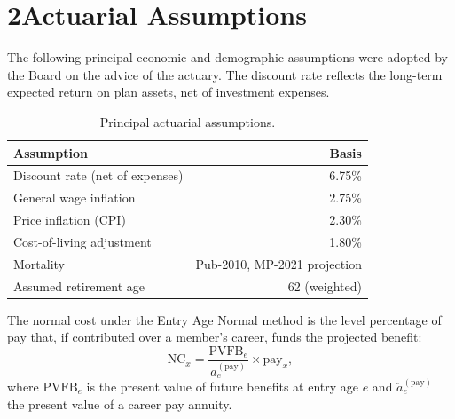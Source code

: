 \section{2\quad Actuarial Assumptions}
The following principal economic and demographic assumptions were adopted by the Board on
the advice of the actuary. The discount rate reflects the long-term expected return on plan
assets, net of investment expenses.

\begin{table}[ht]\centering
\caption{Principal actuarial assumptions.}
\begin{tabularx}{\linewidth}{@{}X R@{}}
\toprule
\textbf{Assumption} & \textbf{Basis}\\
\midrule
Discount rate (net of expenses) & 6.75\%\\
General wage inflation          & 2.75\%\\
Price inflation (CPI)           & 2.30\%\\
Cost-of-living adjustment       & 1.80\%\\
Mortality                       & Pub-2010, MP-2021 projection\\
Assumed retirement age          & 62 (weighted)\\
\bottomrule
\end{tabularx}
\end{table}

The normal cost under the Entry Age Normal method is the level percentage of pay that, if
contributed over a member's career, funds the projected benefit:
\begin{equation}
\text{NC}_x = \frac{\text{PVFB}_{e}}{\ddot{a}^{(\text{pay})}_{e}}\times \text{pay}_x,
\end{equation}
where $\text{PVFB}_e$ is the present value of future benefits at entry age $e$ and
$\ddot{a}^{(\text{pay})}_{e}$ the present value of a career pay annuity.
